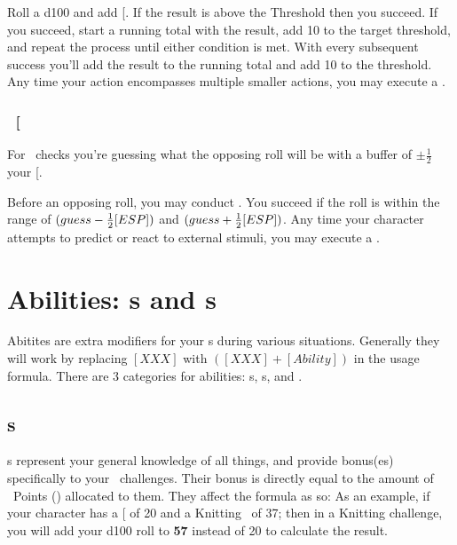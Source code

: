 \noindent Roll a d100 and add {[}\SPED{]}. If the result is above the Threshold then you succeed. If you succeed, start a running total with the result, add 10 to the target threshold, and repeat the process until either condition is met. With every subsequent success you'll add the result to the running total and add 10 to the threshold. 
\fillrlinemid
\noindent Any time your action encompasses multiple smaller actions, you may execute a \SPED .

\clearpage
\subsection{\FOREful\ {[}\FORE\index{\attribute!\FOREful}{]}}\label{subsec:esp}
\noindent For \FOREful\ checks you're guessing what the opposing roll will be with a buffer of $\pm \frac{1}{2}$ your {[}\FORE{]}.

\noindent Before an opposing roll, you may conduct \FORE. You succeed if the roll is within the range of $(guess - \frac{1}{2}[ESP])$ and $(guess + \frac{1}{2}[ESP])$.
\fillrlinemid
\noindent Any time your character attempts to predict or react to external stimuli, you may execute a \FORE.

\clearpage
\chapter{Abilities: \skill s and \techn s}\label{ch:skills_and_tech}
Abitites are extra modifiers for your \attribute s during various situations. Generally they will work by replacing $[XXX]$ with $([XXX]+[Ability])$ in the usage formula. There are 3 categories for abilities: \skill s, \techn s, and \AWEAWF.

\section{\skill s}\label{sec:skills}
\skill s represent your general knowledge of all things, and provide bonus(es) specifically to your \KNOW\ challenges. Their bonus is directly equal to the amount of \skill\ Points (\skillval) allocated to them. They affect the formula as so:
As an example, if your character has a {[}\KNOW{]} of 20 and a Knitting \skill\ of 37; then in a Knitting challenge, you will add your d100 roll to \textbf{57} instead of 20 to calculate the result.

